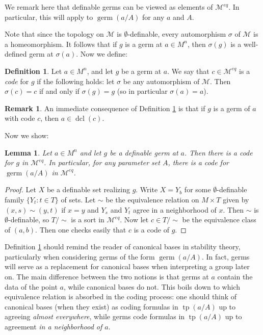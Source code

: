 \documentclass{amsart}
\newtheorem{lemma}[theorem]{Lemma}
\theoremstyle{definition}
\newtheorem{definition}[theorem]{Definition}
\newtheorem{remark}[theorem]{Remark}
\newcommand{\dcl}{\operatorname{dcl}}
\newcommand{\tp}{\operatorname{tp}}
\begin{document}
We remark here that definable germs can be viewed as elements of $\mathcal M^{eq}$. In particular, this will apply to $\operatorname{germ}(a/A)$ for any $a$ and $A$. 

Note that since the topology on $\mathcal M$ is $\emptyset$-definable, every automorphism $\sigma$ of $\mathcal M$ is a homeomorphism. It follows that if $g$ is a germ at $a\in M^n$, then $\sigma(g)$ is a well-defined germ at $\sigma(a)$. Now we define:

\begin{definition}\label{D: germ code}
    Let $a\in M^n$, and let $g$ be a germ at $a$. We say that $c\in\mathcal M^{eq}$ is a \textit{code} for $g$ if the following holds: let $\sigma$ be any automorphism of $\mathcal M$. Then $\sigma(c)=c$ if and only if $\sigma(g)=g$ (so in particular $\sigma(a)=a$).
\end{definition}

\begin{remark}
    An immediate consequence of Definition \ref{D: germ code} is that if $g$ is a germ of $a$ with code $c$, then $a\in\dcl(c)$.
\end{remark}


Now we show:

\begin{lemma}\label{L: germ codes}
    Let $a\in M^n$ and let $g$ be a definable germ at $a$. Then there is a code for $g$ in $\mathcal M^{eq}$. In particular, for any parameter set $A$, there is a code for $\operatorname{germ}(a/A)$ in $\mathcal M^{eq}$.
\end{lemma}
\begin{proof}
    Let $X$ be a definable set realizing $g$. Write $X=Y_b$ for some $\emptyset$-definable family $\{Y_t:t\in T\}$ of sets. Let $\sim$ be the equivalence relation on $M\times T$ given by $(x,s)\sim(y,t)$ if $x=y$ and $Y_s$ and $Y_t$ agree in a neighborhood of $x$. Then $\sim$ is $\emptyset$-definable, so $T/\sim$ is a sort in $\mathcal M^{eq}$. Now let $c\in T/\sim$ be the equivalence class of $(a,b)$. Then one checks easily that $c$ is a code of $g$. 
\end{proof}

Definition \ref{D: germ code} should remind the reader of canonical bases in stability theory, particularly when considering germs of the form $\operatorname{germ}(a/A)$. In fact, germs will serve as a replacement for canonical bases when interpreting a group later on. The main difference between the two notions is that germs at $a$ contain the data of the point $a$, while canonical bases do not. This boils down to which equivalence relation is absorbed in the coding process: one should think of canonical bases (when they exist) as coding formulas in $\operatorname{tp}(a/A)$ up to agreeing \textit{almost everywhere}, while germs code formulas in $\tp(a/A)$ up to agreement \textit{in a neighborhood of $a$}.
\end{document}
